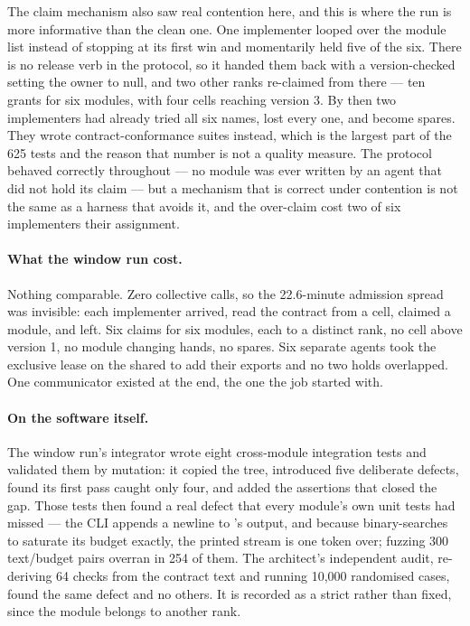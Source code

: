 The claim mechanism also saw real contention here, and this is where the run is
more informative than the clean one.  One implementer looped over the module
list instead of stopping at its first win and momentarily held five of the six.
There is no release verb in the protocol, so it handed them back with a
version-checked  setting the owner to null, and two other ranks
re-claimed from there --- ten grants for six modules, with four cells reaching
version 3.  By then two implementers had already tried all six names, lost
every one, and become spares.  They wrote contract-conformance suites instead,
which is the largest part of the 625 tests and the reason that number is not a
quality measure.  The protocol behaved correctly throughout --- no module was
ever written by an agent that did not hold its claim --- but a mechanism that
is correct under contention is not the same as a harness that avoids it, and
the over-claim cost two of six implementers their assignment.

\paragraph{What the window run cost.}  Nothing comparable.  Zero collective
calls, so the 22.6-minute admission spread was invisible: each implementer
arrived, read the contract from a cell, claimed a module, and left.  Six
claims for six modules, each to a distinct rank, no cell above version 1, no
module changing hands, no spares.  Six separate agents took the exclusive lease
on the shared  to add their exports and no two holds
overlapped.  One communicator existed at the end, the one the job started with.

\paragraph{On the software itself.}  The window run's integrator wrote eight
cross-module integration tests and validated them by mutation: it copied the
tree, introduced five deliberate defects, found its first pass caught only
four, and added the assertions that closed the gap.  Those tests then found a
real defect that every module's own unit tests had missed --- the CLI appends a
newline to 's output, and because  binary-searches
to saturate its budget exactly, the printed stream is one token over; fuzzing
300 text/budget pairs overran in 254 of them.  The architect's independent
audit, re-deriving 64 checks from the contract text and running 10{,}000
randomised cases, found the same defect and no others.  It is recorded as a
strict  rather than fixed, since the module belongs to another
rank.

